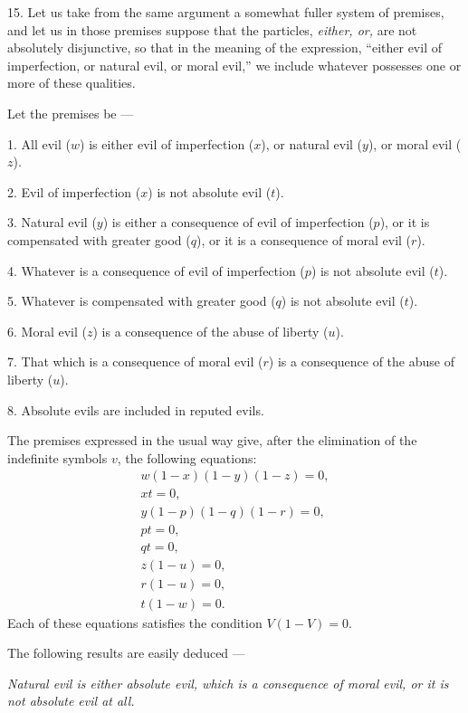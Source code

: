 \documentclass[oneside]{book}
\begin{document}
15. Let us take from the same argument a somewhat fuller
system of premises, and let us in those premises suppose that the
particles, \emph{either, or,} are not absolutely disjunctive, so that in the
meaning of the expression, ``either evil of imperfection, or natural evil, or moral evil,'' we include whatever possesses one or
more of these qualities.

Let the premises be ---

1. All evil ($w$) is either evil of imperfection ($x$), or natural
evil ($y$), or moral evil ($z$).

2. Evil of imperfection ($x$) is not absolute evil ($t$).

3. Natural evil ($y$) is either a consequence of evil of imperfection ($p$), or it is compensated with greater good ($q$), or it is a
consequence of moral evil ($r$).

4. Whatever is a consequence of evil of imperfection ($p$) is
not absolute evil ($t$).

5. Whatever is compensated with greater good ($q$) is not
absolute evil ($t$).

6. Moral evil ($z$) is a consequence of the abuse of liberty ($u$).

7. That which is a consequence of moral evil ($r$) is a consequence of the abuse of liberty ($u$).

8. Absolute evils are included in reputed evils.

The premises expressed in the usual way give, after the elimination of the indefinite symbols $v$, the following equations:
\begin{gather*}
  w(1-x)(1-y)(1-z) = 0,    \tag{1}   \\
  xt = 0,                  \tag{2}   \\
  y(1-p)(1-q)(1-r) = 0,    \tag{3}   \\
  pt = 0,                  \tag{4}   \\
  qt = 0,                  \tag{5}   \\
  z(1-u) = 0,              \tag{6}   \\
  r(1-u) = 0,              \tag{7}   \\
  t(1-w) = 0.              \tag{8}
\end{gather*}
Each of these equations satisfies the condition $V(1-V) = 0$.

The following results are easily deduced ---

\emph{Natural evil is either absolute evil, which is a consequence of moral evil, or it is not absolute evil at all.}
\end{document}
